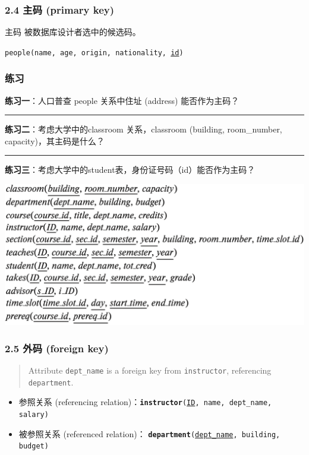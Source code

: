 \documentclass[aspectratio=169, 14pt]{beamer}
\begin{document}
\begin{frame}
    \frametitle{2.4 主码 (primary key)}
\begin{exampleblock}{主码}
    被数据库设计者选中的候选码。
\end{exampleblock}
    
\texttt{people(name, age, origin, nationality, \underline{id})}

\end{frame}

\begin{frame}
    \frametitle{练习}
\textbf{练习一}：人口普查 people 关系中住址 (address) 能否作为主码？    
\pause
\noindent\rule{\textwidth}{1pt}
\textbf{练习二}：考虑大学中的classroom 关系，classroom (building, room\_number, capacity)，其主码是什么？
\pause
\noindent\rule{\textwidth}{1pt}
\textbf{练习三}：考虑大学中的student表，身份证号码（id）能否作为主码？
\end{frame}

\begin{frame}
\begin{center}
    \includegraphics[height=.75\paperheight]{table/schema}
\end{center} 

\end{frame}

\begin{frame}
    \frametitle{2.5 外码 (foreign key)}

    \begin{quote}
        Attribute \texttt{dept\_name} is a \alert{foreign key} from \texttt{instructor}, referencing \texttt{department}.
    \end{quote}


    \begin{itemize}
        \item \alert{参照关系} (referencing relation)：\texttt{\textbf{instructor}(\underline{ID}, name, dept\_name, salary)}
        \item  \alert{被参照关系} (referenced relation)：
        \texttt{\textbf{department}(\underline{dept\_name}, building, budget)}
    \end{itemize}

\pause
\end{frame}
\end{document}
